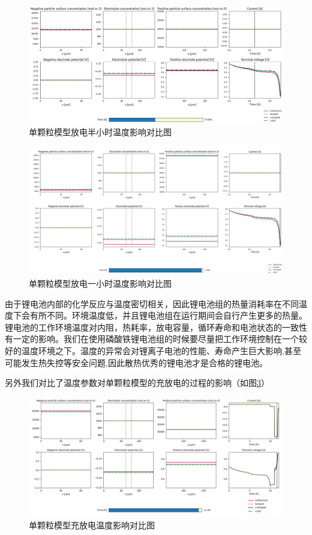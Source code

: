 \documentclass[12pt]{ctexart}%
\begin{document}
\begin{figure}[H]
	\centering
	\includegraphics[scale = 0.4]{T1}
	\caption{单颗粒模型放电半小时温度影响对比图}
	\label{i}
\end{figure}

\begin{figure}[H]
	\centering
	\includegraphics[scale = 0.32]{T2}
	\caption{单颗粒模型放电一小时温度影响对比图}
	\label{j}
\end{figure}

由于锂电池内部的化学反应与温度密切相关，因此锂电池组的热量消耗率在不同温度下会有所不同。环境温度低，并且锂电池组在运行期间会自行产生更多的热量。锂电池的工作环境温度对内阻，热耗率，放电容量，循环寿命和电池状态的一致性有一定的影响。我们在使用磷酸铁锂电池组的时候要尽量把工作环境控制在一个较好的温度环境之下。温度的异常会对锂离子电池的性能、寿命产生巨大影响,甚至可能发生热失控等安全问题,因此散热优秀的锂电池才是合格的锂电池。

另外我们对比了温度参数对单颗粒模型的充放电的过程的影响（如图\ref{aa}）
\begin{figure}[h]
	\centering
	\includegraphics[scale = 0.4]{6}
	\caption{单颗粒模型充放电温度影响对比图}
	\label{aa}
\end{figure}
\end{document}
